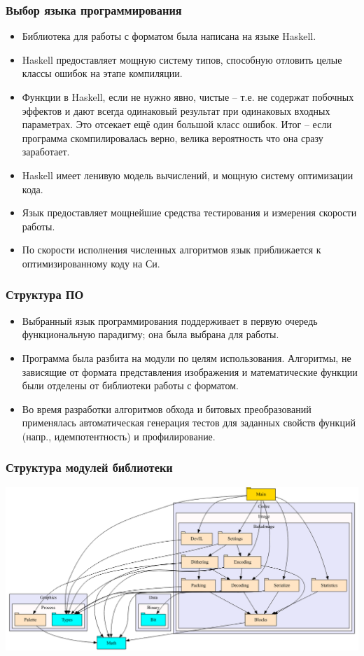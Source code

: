 \documentclass{beamer}
\begin{document}
\begin{frame}
\frametitle{Выбор языка программирования}

\begin{itemize}
\item Библиотека для работы с форматом была написана на языке Haskell.
\item Haskell предоставляет мощную систему типов, способную отловить целые
  классы ошибок на этапе компиляции.
\item Функции в Haskell, если не нужно явно, чистые -- т.е. не содержат побочных
  эффектов и дают всегда одинаковый результат при одинаковых входных
  параметрах. Это отсекает ещё один большой класс ошибок. Итог -- если программа
  скомпилировалась верно, велика вероятность что она сразу заработает.
\item Haskell имеет ленивую модель вычислений, и мощную систему оптимизации
  кода.
\item Язык предоставляет мощнейшие средства тестирования и измерения скорости
  работы.
\item По скорости исполнения численных алгоритмов язык приближается к
  оптимизированному коду на Си.
\end{itemize}

\end{frame}

\begin{frame}
\frametitle{Структура ПО}

\begin{itemize}
\item Выбранный язык программирования поддерживает в первую очередь
  функциональную парадигму; она была выбрана для работы.
\item Программа была разбита на модули по целям использования. Алгоритмы, не
  зависящие от формата представления изображения и математические функции
  были отделены от библиотеки работы с форматом.
\item Во время разработки алгоритмов обхода и битовых преобразований применялась
  автоматическая генерация тестов для заданных свойств функций (напр.,
  идемпотентность) и профилирование.
\end{itemize}

\end{frame}

\begin{frame}
\frametitle{Структура модулей библиотеки}

\includegraphics[width=\textwidth]{img/structure}

\end{frame}
\end{document}
